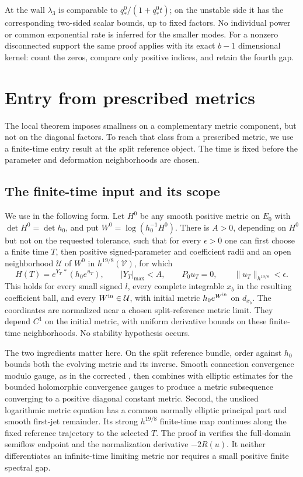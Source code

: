 \documentclass[11pt]{amsart}
\theoremstyle{definition}
\theoremstyle{remark}
\begin{document}
At the wall $\lambda_3$ is comparable to
$q_*^0/(1+q_*^0t)$; on the unstable side it has the
corresponding two-sided scalar bounds, up to fixed factors.
No individual power or common exponential rate is inferred
for the smaller modes. For a nonzero disconnected support
the same proof applies with its exact $b-1$ dimensional
kernel: count the zeros, compare only positive indices,
and retain the fourth gap.

\section{Entry from prescribed metrics}\label{sec:entry}

The local theorem imposes smallness on a complementary metric
component, but not on the diagonal factors. To reach that class
from a prescribed metric, we use a finite-time entry result
at the split reference object. The time is fixed before the
parameter and deformation neighborhoods are chosen.

\subsection{The finite-time input and its scope}
We use \cite[Proposition 6.2]{WuebbenPhase26} in the following
form. Let $H^0$ be any smooth positive metric on $E_0$ with
$\det H^0=\det h_0$, and put $W^0=\log(h_0^{-1}H^0)$.
There is $A>0$, depending on $H^0$ but not on the requested
tolerance, such that for every $\epsilon>0$ one can first
choose a finite time $T$, then positive signed-parameter
and coefficient radii and an open neighborhood $\mathcal U$
of $W^0$ in $h^{19/8}(\mathcal V)$, for which
\begin{equation}\label{eq:entry-input}
 H(T)=e^{Y_T\,*}(h_0e^{u_T}),\qquad
 |Y_T|_{\max}<A,\qquad P_0u_T=0,\qquad
 \|u_T\|_{h^{19/8}}<\epsilon .
\end{equation}
This holds for every small signed $l$, every complete
integrable $x_b$ in the resulting coefficient ball, and every
$W^{\rm in}\in\mathcal U$, with initial metric $h_0e^{W^{\rm in}}$
on $d_{x_b}$. The coordinates are normalized near a chosen
split-reference metric limit. They depend $C^1$ on the
initial metric, with uniform derivative bounds on these
finite-time neighborhoods. No stability hypothesis occurs.

The two ingredients matter here. On the split reference
bundle, order against $h_0$ bounds both the evolving metric
and its inverse. Smooth connection convergence modulo gauge,
as in the corrected \cite[Theorem 1.1(2)]{SibleyWentworth15},
then combines with elliptic estimates for the bounded
holomorphic convergence gauges to produce a metric subsequence
converging to a positive diagonal constant metric.
Second, the unsliced logarithmic metric equation has a common
normally elliptic principal part and smooth first-jet remainder.
Its strong $h^{19/8}$ finite-time map continues along the fixed
reference trajectory to the selected $T$.
The proof in \cite[Section 6]{WuebbenPhase26} verifies the
full-domain semiflow endpoint and the normalization derivative
$-2R(u)$. It neither differentiates an infinite-time limiting
metric nor requires a small positive finite spectral gap.
\end{document}
